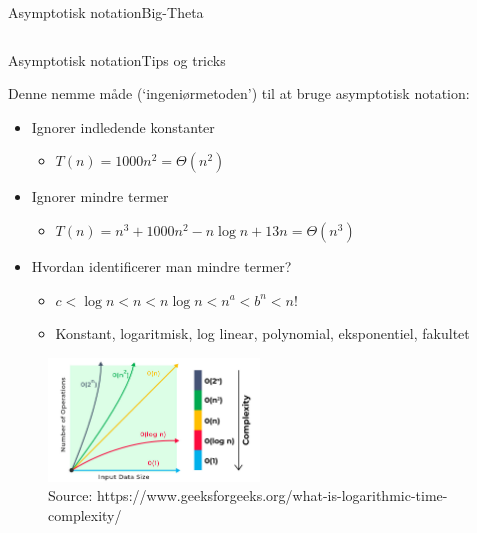 \documentclass{beamer}
\begin{document}
\begin{frame}{Asymptotisk notation}{Big-Theta}
\begin{columns}
    \end{columns}
\end{frame}

\begin{frame}{Asymptotisk notation}{Tips og tricks}

    Denne nemme måde (`ingeniørmetoden') til at bruge asymptotisk notation:
    \pause
    \begin{itemize}[<+->]
        \item Ignorer indledende konstanter
            \begin{itemize}
                \item $T(n) = 1000n^2 = \Theta(n^2)$
            \end{itemize}
        \item Ignorer mindre termer
            \begin{itemize}
                \item $T(n) = n^3 + 1000n^2 - n \log n + 13n = \Theta(n^3)$
            \end{itemize}
        \item Hvordan identificerer man mindre termer?
            \begin{itemize}
                \item $c < \log n < n < n \log n < n^a < b^n < n!~$
                \item Konstant, logaritmisk, log linear, polynomial,
                    eksponentiel, fakultet
            \end{itemize}
    \end{itemize}

    \pause
    \begin{figure}[h]
        \centering
        \includegraphics[width=0.5\textwidth]{time-complexity}
        \caption{Source: https://www.geeksforgeeks.org/what-is-logarithmic-time-complexity/}
        \label{fig:time-complexity}
    \end{figure}
\end{frame}
\end{document}
